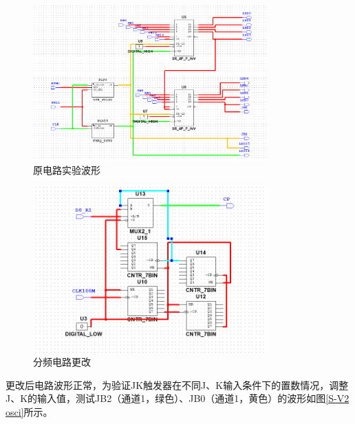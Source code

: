 \documentclass[UTF8]{ctexart}
\numberwithin{figure}{subsection}
\numberwithin{table}{subsection}
\numberwithin{equation}{subsection}
\begin{document}
\begin{figure}[H]
    \begin{center}
        \includegraphics[width=0.8\textwidth]{pics/S-V2/circuit.png}
    \end{center}
    \caption{原电路实验波形}
    \label{S-V2 chaos}
\end{figure}


\begin{figure}[H]
    \begin{center}
        \includegraphics[width=0.8\textwidth]{pics/S-V2/MODIFY FREQ DIV.png}
    \end{center}
    \caption{分频电路更改}
    \label{S-V2 mod freq}
\end{figure}

更改后电路波形正常，为验证JK触发器在不同J、K输入条件下的置数情况，调整J、K的输入值，测试JB2（通道1，绿色）、JB0（通道1，黄色）的波形如图\ref{S-V2 osci}所示。
\end{document}
